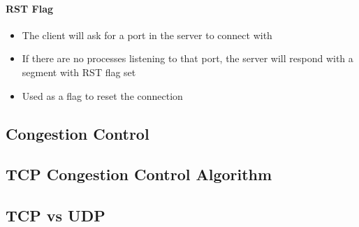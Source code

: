 \paragraph{RST Flag}
\begin{itemize}
	\item The client will ask for a port in the server to connect with
	\item If there are no processes listening to that port, the server will respond with a segment with RST flag set
	\item Used as a flag to reset the connection 
\end{itemize}


\subsection{Congestion Control}

\subsection{TCP Congestion Control Algorithm}

\subsection{TCP vs UDP}